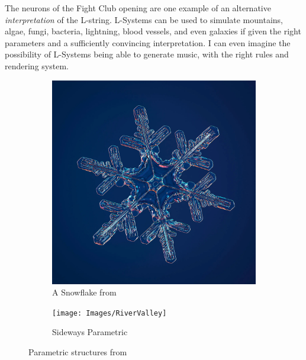 \documentclass[12pt,twoside]{reedthesis}
\begin{document}
	
	The neurons of the Fight Club opening are one example of an alternative \textit{interpretation} of the L-string. L-Systems can be used to simulate mountains, algae, fungi, bacteria, lightning, blood vessels, and even galaxies if given the right parameters and a sufficiently convincing interpretation. I can even imagine the possibility of L-Systems being able to generate music, with the right rules and rendering system.
	
	
	\begin{figure}[h]
	\centering
	\begin{subfigure}{0.48\linewidth}
		\centering
		\includegraphics[width=\linewidth]{Images/Snowflake}
		\caption{A Snowflake from \cite{myhrvold2021}}
		\label{UpwardParametric}
	\end{subfigure}%
	\hfill
	\begin{subfigure}{0.48\linewidth}
		\centering
		\texttt{[image: Images/RiverValley]}
		\caption{Sideways Parametric}
		\label{SidewaysParametric}
	\end{subfigure}
	\caption{Parametric structures from \cite{LSystems2001}}
	\label{Parametric}
	\end{figure}
	
\end{document}
